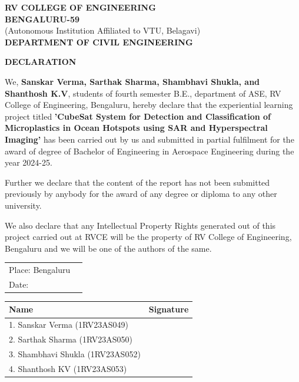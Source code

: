 \documentclass[12pt]{article}
\begin{document}
\newpage
\thispagestyle{empty}

\begin{center}
{\large \textbf{RV COLLEGE OF ENGINEERING}}\\
\vspace{0.25cm}
\textbf{BENGALURU-59}\\
\vspace{0.25cm}
{\small (Autonomous Institution Affiliated to VTU, Belagavi)}\\
\vspace{0.25cm}
{\large \textbf{DEPARTMENT OF CIVIL ENGINEERING}}

\vspace{1cm}
{\Large \textbf{DECLARATION}}
\end{center}

\vspace{1.5cm}

We, \textbf{Sanskar Verma, Sarthak Sharma, Shambhavi Shukla, and Shanthosh K.V}, students of fourth semester B.E., department of ASE, RV College of Engineering, Bengaluru, hereby declare that the experiential learning project titled \textbf{'CubeSat System for Detection and Classification of Microplastics in Ocean Hotspots using SAR and Hyperspectral Imaging'} has been carried out by us and submitted in partial fulfilment for the award of degree of Bachelor of Engineering in Aerospace Engineering during the year 2024-25.

Further we declare that the content of the report has not been submitted previously by anybody for the award of any degree or diploma to any other university.

We also declare that any Intellectual Property Rights generated out of this project carried out at RVCE will be the property of RV College of Engineering, Bengaluru and we will be one of the authors of the same.

\vspace{1cm}

\begin{tabular}{ll}
Place: Bengaluru & \\
Date: & \\
\end{tabular}

\vspace{2cm}

\begin{tabular}{|p{}|p{}|}
\hline
\textbf{Name} & \textbf{Signature} \\
\hline
1. Sanskar Verma (1RV23AS049) & \\
\hline
2. Sarthak Sharma (1RV23AS050) & \\
\hline
3. Shambhavi Shukla (1RV23AS052) & \\
\hline
4. Shanthosh KV (1RV23AS053) & \\
\hline
\end{tabular}
\end{document}
